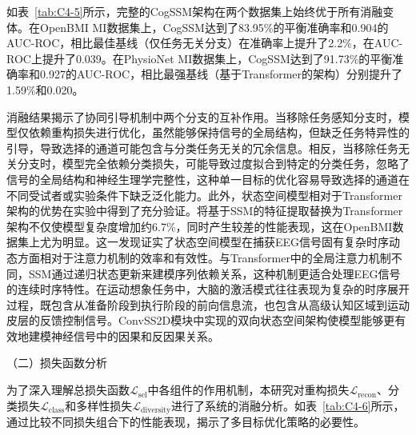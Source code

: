 如表~\ref{tab:C4-5}所示，完整的CogSSM架构在两个数据集上始终优于所有消融变体。在OpenBMI MI数据集上，CogSSM达到了83.95\%的平衡准确率和0.904的AUC-ROC，相比最佳基线（仅任务无关分支）在准确率上提升了2.2\%，在AUC-ROC上提升了0.039。在PhysioNet MI数据集上，CogSSM达到了91.73\%的平衡准确率和0.927的AUC-ROC，相比最强基线（基于Transformer的架构）分别提升了1.59\%和0.020。

消融结果揭示了协同引导机制中两个分支的互补作用。当移除任务感知分支时，模型仅依赖重构损失进行优化，虽然能够保持信号的全局结构，但缺乏任务特异性的引导，导致选择的通道可能包含与分类任务无关的冗余信息。相反，当移除任务无关分支时，模型完全依赖分类损失，可能导致过度拟合到特定的分类任务，忽略了信号的全局结构和神经生理学完整性，这种单一目标的优化容易导致选择的通道在不同受试者或实验条件下缺乏泛化能力。此外，状态空间模型相对于Transformer架构的优势在实验中得到了充分验证。将基于SSM的特征提取替换为Transformer架构不仅使模型复杂度增加约6.7\%，同时产生较差的性能表现，这在OpenBMI数据集上尤为明显。这一发现证实了状态空间模型在捕获EEG信号固有复杂时序动态方面相对于注意力机制的效率和有效性。与Transformer中的全局注意力机制不同，SSM通过递归状态更新来建模序列依赖关系，这种机制更适合处理EEG信号的连续时序特性。在运动想象任务中，大脑的激活模式往往表现为复杂的时序展开过程，既包含从准备阶段到执行阶段的前向信息流，也包含从高级认知区域到运动皮层的反馈控制信号。ConvSS2D模块中实现的双向状态空间架构使模型能够更有效地建模神经信号中的因果和反因果关系。


（二）损失函数分析
\label{subsubsec:loss_analysis}

为了深入理解总损失函数$\mathcal{L}_{\text{sel}}$中各组件的作用机制，本研究对重构损失$\mathcal{L}_{\text{recon}}$、分类损失$\mathcal{L}_{\text{class}}$和多样性损失$\mathcal{L}_{\text{diversity}}$进行了系统的消融分析。如表~\ref{tab:C4-6}所示，通过比较不同损失组合下的性能表现，揭示了多目标优化策略的必要性。

